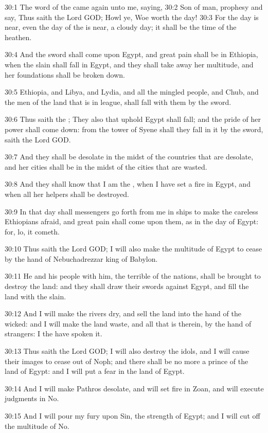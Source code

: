 30:1 The word of the \LORD came again unto me, saying, 30:2 Son of man,
prophesy and say, Thus saith the Lord GOD; Howl ye, Woe worth the day!
30:3 For the day is near, even the day of the \LORD is near, a cloudy
day; it shall be the time of the heathen.

30:4 And the sword shall come upon Egypt, and great pain shall be in
Ethiopia, when the slain shall fall in Egypt, and they shall take away
her multitude, and her foundations shall be broken down.

30:5 Ethiopia, and Libya, and Lydia, and all the mingled people, and
Chub, and the men of the land that is in league, shall fall with them
by the sword.

30:6 Thus saith the \LORD; They also that uphold Egypt shall fall; and
the pride of her power shall come down: from the tower of Syene shall
they fall in it by the sword, saith the Lord GOD.

30:7 And they shall be desolate in the midst of the countries that are
desolate, and her cities shall be in the midst of the cities that are
wasted.

30:8 And they shall know that I am the \LORD, when I have set a fire in
Egypt, and when all her helpers shall be destroyed.

30:9 In that day shall messengers go forth from me in ships to make
the careless Ethiopians afraid, and great pain shall come upon them,
as in the day of Egypt: for, lo, it cometh.

30:10 Thus saith the Lord GOD; I will also make the multitude of Egypt
to cease by the hand of Nebuchadrezzar king of Babylon.

30:11 He and his people with him, the terrible of the nations, shall
be brought to destroy the land: and they shall draw their swords
against Egypt, and fill the land with the slain.

30:12 And I will make the rivers dry, and sell the land into the hand
of the wicked: and I will make the land waste, and all that is
therein, by the hand of strangers: I the \LORD have spoken it.

30:13 Thus saith the Lord GOD; I will also destroy the idols, and I
will cause their images to cease out of Noph; and there shall be no
more a prince of the land of Egypt: and I will put a fear in the land
of Egypt.

30:14 And I will make Pathros desolate, and will set fire in Zoan, and
will execute judgments in No.

30:15 And I will pour my fury upon Sin, the strength of Egypt; and I
will cut off the multitude of No.


